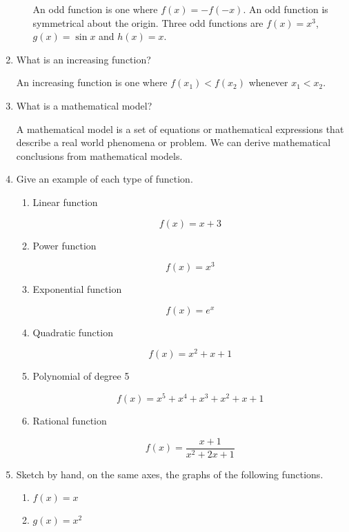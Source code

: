 \documentclass{article}
\begin{document}
\begin{enumerate}
\begin{enumerate}
				An odd function is one where $f(x) = -f(-x)$. An odd
				function is symmetrical about the origin. Three
				odd functions are $f(x) = x^3$, $g(x) = \sin x$ and
				$h(x) = x$.
		\end{enumerate}

		\item What is an increasing function?
		
		An increasing function is one where $f(x_1) < f(x_2)$ whenever $x_1 < x_2$.

		\item What is a mathematical model?

		A mathematical model is a set of equations or mathematical expressions that
		describe a real world phenomena or problem. We can derive mathematical 
		conclusions from mathematical models.

		\item Give an example of each type of function.
		\begin{enumerate}
			\item Linear function

				$$f(x) = x + 3$$

			\item Power function

				$$f(x) = x^3$$

			\item Exponential function

				$$f(x) = e^x$$

			\item Quadratic function

				$$f(x) = x^2 + x + 1$$

			\item Polynomial of degree 5

				$$f(x) = x^5 + x^4 + x^3 + x^2 + x + 1$$

			\item Rational function

				$$f(x) = \frac{x +1}{x^2 + 2x  +1}$$
		\end{enumerate}	

		\item Sketch by hand, on the same axes, the graphs of the following
			functions.

		\begin{enumerate}
			\item $f(x) = x$

			\item $g(x) = x^2$


\end{enumerate}
\end{enumerate}
\end{document}
